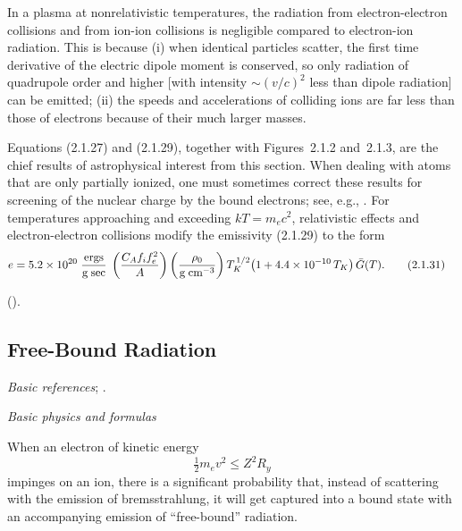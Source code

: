 In a plasma at nonrelativistic temperatures, the radiation from electron-electron
collisions and from ion-ion collisions is negligible compared to electron-ion
radiation.  This is because (i) when identical particles scatter, the first time
derivative of the electric dipole moment is conserved, so only radiation of
quadrupole order and higher [with intensity $\sim(v/c)^2$ less than dipole radiation]
can be emitted; (ii) the speeds and accelerations of colliding ions are far less than
those of electrons because of their much larger masses.

Equations (2.1.27) and (2.1.29), together with Figures~2.1.2 and~2.1.3, are
the chief results of astrophysical interest from this section.  When dealing with
atoms that are only partially ionized, one must sometimes correct these results
for screening of the nuclear charge by the bound electrons; see, e.g.,
\citet{Ginzburg1967}.  For temperatures approaching and exceeding $kT = m_e c^2$,
relativistic effects and electron-electron collisions modify the emissivity
(2.1.29) to the form
\begin{align}
e &= 5.2 \times 10^{20}\;
\frac{\text{ergs}}{\text{g\;sec}}\;
\left(\frac{C_A f_i f_e^2}{A}\right)
\left(\frac{\rho_0}{\text{g\;cm}^{-3}}\right)
T_K^{\,1/2}\bigl(1 + 4.4 \times 10^{-10}\,T_K\bigr)\,\bar{G}(T).
\tag{2.1.31}
\end{align}

\noindent (\citealt{Ginzburg1967}).



\subsection{Free-Bound Radiation}
\label{sec:2.2}

\textit{Basic references}\quad \citet{Jackson1962}; \citet{Ginzburg1967}.

\bigskip
\textit{Basic physics and formulas}

When an electron of kinetic energy
\begin{equation}
\tfrac{1}{2}m_e v^2 \leq Z^2 R_y
\end{equation}
impinges on an ion, there is a significant probability that, instead of scattering
with the emission of bremsstrahlung, it will get captured into a bound state with
an accompanying emission of ``free-bound'' radiation.

